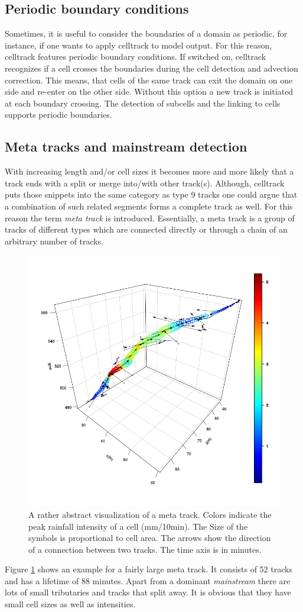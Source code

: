 \documentclass{scrartcl}
\begin{document}
\subsection{Periodic boundary conditions}
Sometimes, it is useful to consider the boundaries of a domain as periodic, for instance, if one wants to apply celltrack to model output. For this reason, celltrack features periodic boundary conditions. If switched on, celltrack recognizes if a cell crosses the boundaries during the cell detection and advection correction. This means, that cells of the same track can exit the domain on one side and re-enter on the other side. Without this option a new track is initiated at each boundary crossing.
The detection of subcells and the linking to cells supports periodic boundaries.

\subsection{Meta tracks and mainstream detection}
\label{sec:aco}
With increasing length and/or cell sizes it becomes more and more likely that a track ends with a split or merge into/with other track(s). Although, celltrack puts those snippets into the same category as type 9 tracks one could argue that a combination of such related segments forms a complete track as well. For this reason the term \textit{meta track} is introduced. Essentially, a meta track is a group of tracks of different types which are connected directly or through a chain of an arbitrary number of tracks.
\begin{figure}[h]
	\centering
	\includegraphics[width=.8\linewidth]{scatter3D_meta_2}
	\caption{A rather abstract visualization of a meta track. Colors indicate the peak rainfall intensity of a cell (mm/10min). The Size of the symbols is proportional to cell area. The arrows show the direction of a connection between two tracks. The time axis is in minutes.}
	\label{meta_track}
\end{figure}
Figure \ref{meta_track} shows an example for a fairly large meta track. It consists of 52 tracks and has a lifetime of 88 minutes. Apart from a dominant \textit{mainstream} there are lots of small tributaries and tracks that split away. It is obvious that they have small cell sizes as well as intensities.
\end{document}
